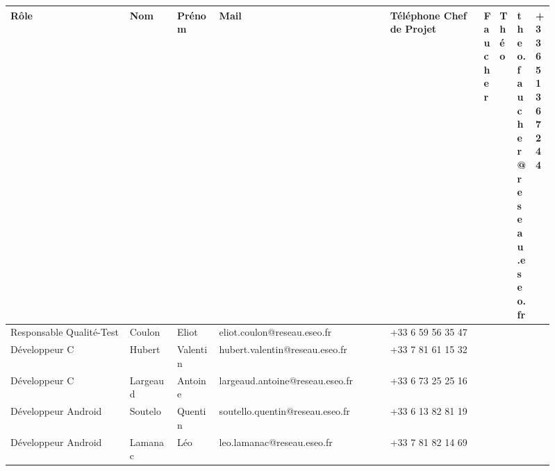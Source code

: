 \begin{longtable}{|p{0.23\linewidth}|p{0.090\linewidth}|p{0.08\linewidth}|p{0.33\linewidth}|p{0.18\linewidth}|}
    \hline
    Rôle                        & Nom       & Prénom    & Mail                              & Téléphone   \endfirsthead
    \hline
    Chef de Projet              & Faucher   & Théo      & theo.faucher@reseau.eseo.fr       & +33 6 51 36 72 44\\
    \hline
    Responsable Qualité-Test    & Coulon    & Eliot     & eliot.coulon@reseau.eseo.fr       & +33 6 59 56 35 47\\
    \hline
    Développeur C               & Hubert    & Valentin  & hubert.valentin@reseau.eseo.fr    & +33 7 81 61 15 32\\
    \hline
    Développeur C               & Largeaud  & Antoine   & largeaud.antoine@reseau.eseo.fr   & +33 6 73 25 25 16\\
    \hline
    Développeur Android         & Soutelo   & Quentin   & soutello.quentin@reseau.eseo.fr   & +33 6 13 82 81 19\\
    \hline
    Développeur Android         & Lamanac   & Léo       & leo.lamanac@reseau.eseo.fr        & +33 7 81 82 14 69\\
    \hline
\end{longtable}












